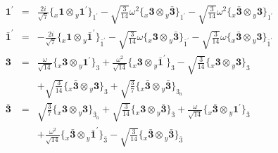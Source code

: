 \documentclass[english]{article}
\newcommand{\rep}[1]{\mathbf{#1}}
\newcommand{\repx}[2]{{}_{#2}\mathbf{#1}}
\newcommand{\subcg}[3]{\big\{ \repx{#1}{x}\otimes\repx{#2}{y}\big\}^{}_{#3}}
\begin{document}
\begin{itemize}
\begin{eqnarray*}
\rep{1^{\prime}} &=& \frac{2 i}{\sqrt{7}}\subcg{1}{1^{\prime}}{1^{\prime}}-\sqrt{\frac{3}{14}} \omega ^2\subcg{3}{\bar{3}}{1^{\prime}}-\sqrt{\frac{3}{14}} \omega ^2\subcg{\bar{3}}{3}{1^{\prime}}
\\
\rep{\bar{1}^{\prime}} &=& -\frac{2 i}{\sqrt{7}}\subcg{1}{\bar{1}^{\prime}}{\bar{1}^{\prime}}-\sqrt{\frac{3}{14}} \omega\subcg{3}{\bar{3}}{\bar{1}^{\prime}}-\sqrt{\frac{3}{14}} \omega\subcg{\bar{3}}{3}{\bar{1}^{\prime}}
\\
\rep{3} &=& \frac{\omega }{\sqrt{14}}\subcg{3}{1^{\prime}}{3}+\frac{\omega ^2}{\sqrt{14}}\subcg{3}{\bar{1}^{\prime}}{3}-\sqrt{\frac{3}{14}}\subcg{3}{3}{3} \\ 
 & & +\sqrt{\frac{3}{14}}\subcg{\bar{3}}{3}{3}+\sqrt{\frac{3}{7}}\subcg{\bar{3}}{\bar{3}}{3_{a}}
\\
\rep{\bar{3}} &=& \sqrt{\frac{3}{7}}\subcg{3}{3}{\bar{3}_{a}}+\sqrt{\frac{3}{14}}\subcg{3}{\bar{3}}{\bar{3}}+\frac{\omega }{\sqrt{14}}\subcg{\bar{3}}{1^{\prime}}{\bar{3}} \\ 
 & & +\frac{\omega ^2}{\sqrt{14}}\subcg{\bar{3}}{\bar{1}^{\prime}}{\bar{3}}-\sqrt{\frac{3}{14}}\subcg{\bar{3}}{\bar{3}}{\bar{3}}
\end{eqnarray*}
\end{itemize}
\end{document}
